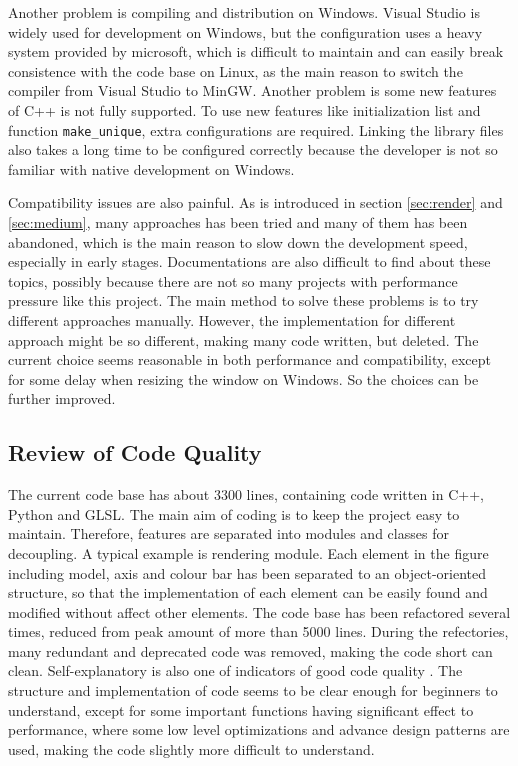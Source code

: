 Another problem is compiling and distribution on Windows. Visual Studio is widely used for development on Windows, but the configuration uses a heavy system provided by microsoft, which is difficult to maintain and can easily break consistence with the code base on Linux, as the main reason to switch the compiler from Visual Studio to MinGW. Another problem is some new features of C++ is not fully supported. To use new features like initialization list and function \lstinline{make_unique}, extra configurations are required. Linking the library files also takes a long time to be configured correctly because the developer is not so familiar with native development on Windows.

Compatibility issues are also painful. As is introduced in section \ref{sec:render} and \ref{sec:medium}, many approaches has been tried and many of them has been abandoned, which is the main reason to slow down the development speed, especially in early stages. Documentations are also difficult to find about these topics, possibly because there are not so many projects with performance pressure like this project. The main method to solve these problems is to try different approaches manually. However, the implementation for different approach might be so different, making many code written, but deleted. The current choice seems reasonable in both performance and compatibility, except for some delay when resizing the window on Windows. So the choices can be further improved.

\subsection{Review of Code Quality}

The current code base has about 3300 lines, containing code written in C++, Python and GLSL. The main aim of coding is to keep the project easy to maintain. Therefore, features are separated into modules and classes for decoupling. A typical example is rendering module. Each element in the figure including model, axis and colour bar has been separated to an object-oriented structure, so that the implementation of each element can be easily found and modified without affect other elements. The code base has been refactored several times, reduced from peak amount of more than 5000 lines. During the refectories, many redundant and deprecated code was removed, making the code short can clean. Self-explanatory is also one of indicators of good code quality \cite{ref:cleancode}. The structure and implementation of code seems to be clear enough for beginners to understand, except for some important functions having significant effect to performance, where some low level optimizations and advance design patterns are used, making the code slightly more difficult to understand.


